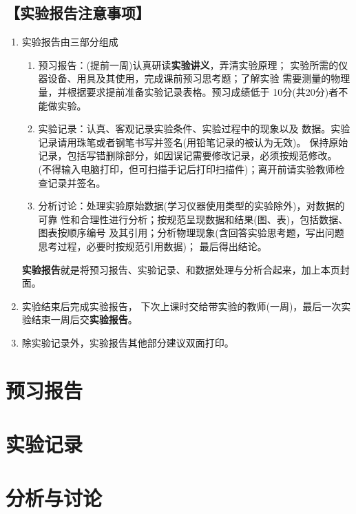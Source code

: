 \documentclass[a4paper,12pt]{ctexart}
\begin{document}
\subsection*{【实验报告注意事项】}
\begin{enumerate}[itemsep=0pt,topsep=0pt]
	\item 实验报告由三部分组成
	\begin{enumerate}[itemsep=0pt,topsep=0pt]
		\item 预习报告：(提前一周)认真研读\textbf{实验讲义}，弄清实验原理；
		实验所需的仪器设备、用具及其使用，完成课前预习思考题；了解实验
		需要测量的物理量，并根据要求提前准备实验记录表格。预习成绩低于
		10分(共20分)者不能做实验。
		\item 实验记录：认真、客观记录实验条件、实验过程中的现象以及
		数据。实验记录请用珠笔或者钢笔书写并签名(用铅笔记录的被认为无效)。
		保持原始记录，包括写错删除部分，如因误记需要修改记录，必须按规范修改。
		(不得输入电脑打印，但可扫描手记后打印扫描件)；离开前请实验教师检查记录并签名。
		\item 分析讨论：处理实验原始数据(学习仪器使用类型的实验除外)，对数据的可靠
		性和合理性进行分析；按规范呈现数据和结果(图、表)，包括数据、图表按顺序编号
		及其引用；分析物理现象(含回答实验思考题，写出问题思考过程，必要时按规范引用数据)；
		最后得出结论。
	\end{enumerate}
	\textbf{实验报告}就是将预习报告、实验记录、和数据处理与分析合起来，加上本页封面。
	\item 实验结束后完成实验报告，
	下次上课时交给带实验的教师(一周)，最后一次实验结束一周后交\textbf{实验报告}。
	\item 除实验记录外，实验报告其他部分建议双面打印。
\end{enumerate}
\newpage

\section*{预习报告}


\newpage
\section*{实验记录}


\newpage
\section*{分析与讨论}
\end{document}
